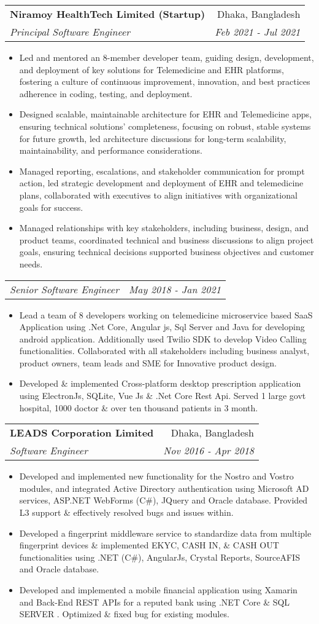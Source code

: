 \documentclass[letterpaper,11pt]{article}
\makeatletter
\newcommand{\resumeItem}[2]{
  \item\small{
    \textbf{#1}{#2 \vspace{-2pt}}
  }
}
\newcommand{\resumeSubheading}[4]{
  \vspace{-1pt}\item
    \begin{tabular*}{0.97\textwidth}[t]{l@{\extracolsep{\fill}}r}
      \textbf{#1} & #2 \\
      \textit{\small#3} & \textit{\small #4} \\
    \end{tabular*}\vspace{-5pt}
}
\newcommand{\resumeSubSubheading}[2]{
    \begin{tabular*}{0.97\textwidth}{l@{\extracolsep{\fill}}r}
      \textit{\small#1} & \textit{\small #2} \\
    \end{tabular*}\vspace{-5pt}
}
\newcommand{\resumeItemListStart}{\begin{itemize}}
\newcommand{\resumeItemListEnd}{\end{itemize}\vspace{-5pt}}
\makeatother
\begin{document}
   \resumeSubheading
      {Niramoy HealthTech Limited (Startup) }{Dhaka, Bangladesh}
      {Principal Software Engineer}{Feb 2021 - Jul 2021}
      \resumeItemListStart
        \resumeItem{}
          {Led and mentored an 8-member developer team, guiding design, development, and deployment of key solutions for Telemedicine and EHR platforms, fostering a culture of continuous improvement, innovation, and best practices adherence in coding, testing, and deployment.}
        \resumeItem{}
          {Designed scalable, maintainable architecture for EHR and Telemedicine apps, ensuring technical solutions' completeness, focusing on robust, stable systems for future growth, led architecture discussions for long-term scalability, maintainability, and performance considerations.}
        \resumeItem{}
          {Managed reporting, escalations, and stakeholder communication for prompt action, led strategic development and deployment of EHR and telemedicine plans, collaborated with executives to align initiatives with organizational goals for success.}    
      \resumeItem{}
          {Managed relationships with key stakeholders, including business, design, and product teams, coordinated technical and business discussions to align project goals, ensuring technical decisions supported business objectives and customer needs.}
      \resumeItemListEnd
      \resumeSubSubheading
      {Senior Software Engineer}{May 2018 - Jan 2021}
      \resumeItemListStart
        \resumeItem{}
         {Lead a team of 8 developers working on telemedicine microservice based SaaS Application using .Net Core, Angular js, Sql Server and Java for developing android application. Additionally used Twilio SDK to develop Video Calling functionalities. Collaborated with all stakeholders including business analyst, product owners, team leads and
         SME for Innovative product design.}
        \resumeItem{}
         {Developed \& implemented Cross-platform desktop prescription application using ElectronJs, SQLite,  Vue Js \& .Net Core Rest Api. Served 1 large govt hospital, 1000 doctor \& over ten thousand patients in 3 month.}
    \resumeItemListEnd
    
    \resumeSubheading
      {LEADS Corporation Limited}{Dhaka, Bangladesh}
      {Software Engineer}{Nov 2016 - Apr 2018}
      \resumeItemListStart
      \resumeItem{}
      {Developed and implemented new functionality for the Nostro and Vostro modules, and integrated Active Directory authentication using Microsoft AD services, ASP.NET WebForms (C\#), JQuery and Oracle database. Provided L3 support \& effectively resolved bugs and issues within.}
        \resumeItem{}
          {Developed a fingerprint middleware service to standardize data from multiple fingerprint devices \& implemented EKYC, CASH IN, \& CASH OUT functionalities using .NET (C\#), AngularJs, Crystal Reports, SourceAFIS and Oracle database.}
        \resumeItem{}
          {Developed and implemented a mobile financial application using Xamarin and  Back-End REST APIs for a reputed bank using .NET Core \& SQL SERVER . Optimized \& fixed bug for existing modules. }
      \resumeItemListEnd
\end{document}
